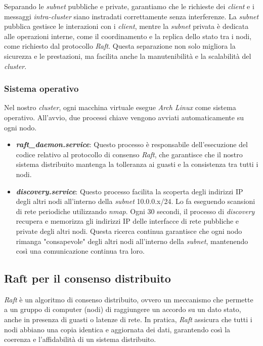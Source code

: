 Separando le \textit{subnet} pubbliche e private, garantiamo che le richieste dei \textit{client} e i messaggi \textit{intra-cluster} siano instradati correttamente senza interferenze. La \textit{subnet} pubblica gestisce 
le interazioni con i \textit{client}, mentre la \textit{subnet} privata è dedicata alle operazioni interne, come il coordinamento e la replica dello stato tra i nodi, come richiesto dal protocollo \textit{Raft}. Questa separazione 
non solo migliora la sicurezza e le prestazioni, ma facilita anche la manutenibilità e la scalabilità del \textit{cluster}.

\subsubsection{Sistema operativo}
Nel nostro \textit{cluster}, ogni macchina virtuale esegue \textit{Arch Linux} come sistema operativo. All'avvio, due processi chiave vengono avviati automaticamente su ogni nodo.
\begin{itemize}
  \item \textit{\textbf{raft\_daemon.service}}: Questo processo è responsabile dell'esecuzione del codice relativo al protocollo di consenso \textit{Raft}, che garantisce che il nostro sistema distribuito mantenga la tolleranza 
    ai guasti e la consistenza tra tutti i nodi.
  \item \textit{\textbf{discovery.service}}: Questo processo facilita la scoperta degli indirizzi IP degli altri nodi all'interno della \textit{subnet} 10.0.0.x/24. Lo fa eseguendo scansioni di rete periodiche utilizzando 
    \textit{nmap}. Ogni 30 secondi, il processo di \textit{discovery} recupera e memorizza gli indirizzi IP delle interfacce di rete pubbliche e private degli altri nodi. Questa ricerca continua garantisce che ogni nodo 
    rimanga "consapevole" degli altri nodi all'interno della \textit{subnet}, mantenendo così una comunicazione continua tra loro.
\end{itemize}



\subsection{Raft per il consenso distribuito}
\textit{Raft} è un algoritmo di consenso distribuito, ovvero un meccanismo che permette 
a un gruppo di computer (nodi) di raggiungere un accordo su un dato stato, 
anche in presenza di guasti o latenze di rete. In pratica, 
\textit{Raft} assicura che tutti i nodi abbiano una copia identica e 
aggiornata dei dati, garantendo così la coerenza e l'affidabilità di un sistema distribuito.

